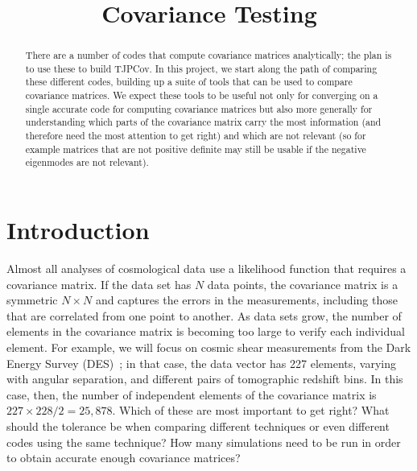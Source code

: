 \documentclass[twocolumn]{\docclass}
\begin{document}
	
	\title{Covariance Testing}
	
	\maketitlepre
	
	\begin{abstract}
		
		There  are a number of codes that compute covariance matrices analytically; the plan is to use these to build TJPCov. In this project, we start along the path of comparing these different codes, building up a suite of tools that can be used to compare covariance matrices. We expect these tools to be useful not only for converging on a single accurate code for computing covariance matrices but also more generally for understanding which parts of the covariance matrix carry the most information (and therefore need the most attention to get right) and which are not relevant (so for example matrices that are not positive definite may still be usable if the negative eigenmodes are not relevant).
	\end{abstract}
	
	\dockeys{}
	
	\maketitlepost
	
	
	\section{Introduction}
	\label{sec:intro}
	
	Almost all analyses of cosmological data use a likelihood function that requires a covariance matrix. If the data set has $N$ data points, the covariance matrix is a symmetric $N\times N$ and captures the errors in the measurements, including those that are correlated from one point to another. As data sets grow, the number of elements in the covariance matrix is becoming too large to verify each individual element. For example, we will focus on cosmic shear measurements from the Dark Energy Survey (DES)~\cite{Troxel:2017xyo}; in that case, the data vector has 227 elements, varying with angular separation, and different pairs of tomographic redshift bins. In this case, then, the number of independent elements of the covariance matrix is $227\times 228/2=25,878$. Which of these are most important to get right? What should the tolerance be when comparing different techniques or even different codes using the same technique? How many simulations need to be run in order to obtain accurate enough covariance matrices? 
	
\end{document}
